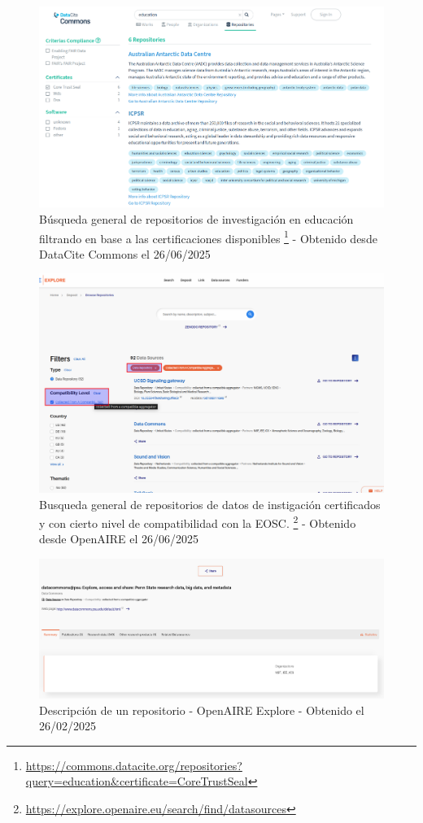 \documentclass[runningheads]{llncs}
\begin{document}
\begin{figure}
    \centering
    \includegraphics[width=0.5\linewidth]{img/datacite_commons_gral_search.png}
    \caption{Búsqueda general de repositorios de investigación en educación filtrando en base a las certificaciones disponibles 
    \footnote{\url{https://commons.datacite.org/repositories?query=education&certificate=CoreTrustSeal}}
    - Obtenido desde DataCite Commons el 26/06/2025}
    \label{fig:datacite_commons_gral_search}
\end{figure}

\begin{figure}
    \centering
    \includegraphics[width=0.5\linewidth]{img/openaire_gral_search.png}
    \caption{
Busqueda general de repositorios de datos de instigación certificados y con cierto nivel de compatibilidad con la EOSC.
    \footnote{\url{https://explore.openaire.eu/search/find/datasources}}
    - Obtenido desde OpenAIRE el 26/06/2025
    }
    \label{fig:openaire_gral_search}
\end{figure}

\begin{figure}
    \centering
    \includegraphics[width=0.5\linewidth]{img/repositorio_openaire.png}
    \caption{Descripción de un repositorio - OpenAIRE Explore - Obtenido el 26/02/2025}
    \label{fig:repositorio_openaire}
\end{figure}
\end{document}
